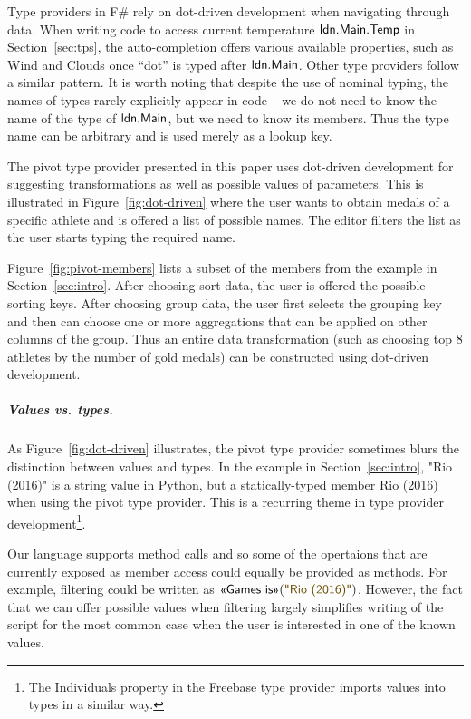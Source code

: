 \documentclass[a4paper,UKenglish]{lipics-v2016}
\theoremstyle{plain}
\theoremstyle{definition}
\newcommand{\str}[1]{\textnormal{\textcolor{strclr}{\sffamily "#1"}}}
\newcommand{\ident}[1]{\textnormal{\sffamily #1}}
\newcommand{\qident}[1]{\textnormal{\sffamily \guillemotleft #1\guillemotright}}
\begin{document}
Type providers in F\# rely on dot-driven development when navigating through data. When writing code 
to access current temperature $\ident{ldn.Main.Temp}$ in Section~\ref{sec:tps}, the auto-completion
offers various available properties, such as \ident{Wind} and \ident{Clouds} once ``dot'' is typed
after $\ident{ldn.Main}$. Other type providers \cite{inforich} follow a similar pattern. It is worth noting
that despite the use of nominal typing, the names of types rarely explicitly appear in code -- we
do not need to know the name of the type of $\ident{ldn.Main}$, but we need to know its members.
Thus the type name can be arbitrary \cite{fsdata} and is used merely as a lookup key.

The pivot type provider presented in this paper uses dot-driven development for suggesting 
transformations as well as possible values of parameters. This is illustrated in Figure~\ref{fig:dot-driven}
where the user wants to obtain medals of a specific athlete and is offered a list of possible 
names. The editor filters the list as the user starts typing the required name. 

Figure~\ref{fig:pivot-members} lists a subset of the members from the
example in Section~\ref{sec:intro}. After choosing \qident{sort data}, the user is offered 
the possible sorting keys. After choosing \qident{group data}, the user first 
selects the grouping key and then can choose one or more aggregations that can be applied on
other columns of the group. Thus an entire data transformation (such as choosing top 8 athletes
by the number of gold medals) can be constructed using dot-driven development.
  
\subparagraph{Values vs. types.}
As Figure~\ref{fig:dot-driven} illustrates, the pivot type provider sometimes blurs the 
distinction between values and types. In the example in Section~\ref{sec:intro},
\str{Rio (2016)} is a string value in Python, but a statically-typed member \qident{Rio (2016)}
when using the pivot type provider. This is a recurring theme in type provider development\footnote{The
\ident{Individuals} property in the Freebase type provider \cite{inforich} imports values into types in a similar way.}.


Our language supports method calls and so some of the opertaions that are currently exposed as
member access could equally be provided as methods. For example, filtering could be written as 
$\qident{Games is}(\str{Rio (2016)})$. However, the fact that we can offer possible values when
filtering largely simplifies writing of the script for the most 
common case when the user is interested in one of the known values.
\end{document}
